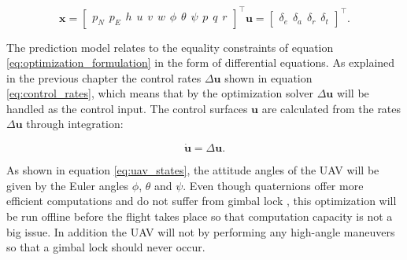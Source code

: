 \begin{subequations}
\begin{equation}
	\label{eq:uav_states}
	\mathbf{x} =
	\begin{bmatrix}
		p_N \hspace{5pt} p_E \hspace{5pt} h \hspace{5pt}
		u \hspace{5pt} v \hspace{5pt} w \hspace{5pt}
		\phi \hspace{5pt} \theta \hspace{5pt} \psi \hspace{5pt}
		p \hspace{5pt} q \hspace{5pt} r
	\end{bmatrix}^\intercal
\end{equation}
\begin{equation}
	\mathbf{u} =
	\begin{bmatrix}
		\delta_e \hspace{5pt} \delta_a \hspace{5pt} \delta_r \hspace{5pt} \delta_t
	\end{bmatrix}^\intercal.
\end{equation}
\end{subequations}

The prediction model relates to the equality constraints of equation \ref{eq:optimization_formulation} in the form of differential equations. As explained in the previous chapter the control rates $\Delta\mathbf{u}$ shown in equation \ref{eq:control_rates}, which means that by the optimization solver $\Delta\mathbf{u}$ will be handled as the control input. The control surfaces $\mathbf{u}$ are calculated from the rates $\Delta\mathbf{u}$ through integration:

\begin{equation}
	\label{eq:control_relation}
	\mathbf{\dot{u}} = \Delta\mathbf{u}.
\end{equation}

As shown in equation \ref{eq:uav_states}, the attitude angles of the UAV will be given by the Euler angles $\phi$, $\theta$ and $\psi$. Even though quaternions offer more efficient computations and do not suffer from gimbal lock \cite{uavBEARD}, this optimization will be run offline before the flight takes place so that computation capacity is not a big issue. In addition the UAV will not by performing any high-angle maneuvers so that a gimbal lock should never occur.


